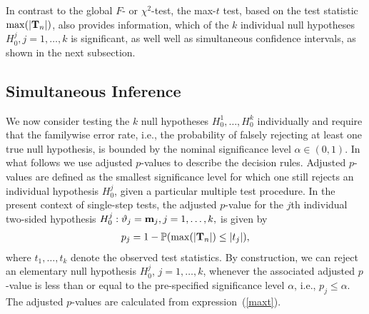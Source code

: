 \documentclass[12pt,a4paper]{article}
\begin{document}
In contrast to the global $F$- or $\chi^2$-test, the max-$t$ test,
based on the test statistic $\max(|\mathbf{T}_n|)$, also provides information, 
which of the $k$ individual null hypotheses $%
H_0^j, j = 1, \dots, k$ is significant,
as well well as simultaneous confidence intervals, as shown in the next
subsection.

\subsection{Simultaneous Inference}

\label{simtest} %

We now consider testing the $k$ null hypotheses $H_0^1, \ldots, H_0^k$
individually and require that the familywise error rate, i.e., the
probability of falsely rejecting at least one true null hypothesis, is
bounded by the nominal significance level $\alpha \in (0, 1)$. In what
follows we use adjusted $p$-values to describe the decision rules. Adjusted $%
p$-values are defined as the smallest significance level for which one still
rejects an individual hypothesis $H_0^j$, given a particular multiple test
procedure. In the present context of single-step tests, the adjusted $p$-value for the $j$th
individual two-sided hypothesis $H_0^j: \vartheta_j = \mathbf{m}_j, j = 1,
\dots, k, $ is given by 
\begin{eqnarray*}
p_j = 1 - \mathbb{P}(\max(|\mathbf{T}_n|) \le |t_j|),
\end{eqnarray*}
where $t_1, \dots, t_k$ denote the observed test statistics. By
construction, we can reject an elementary null hypothesis $H_0^j$, $j= 1,
\ldots, k$, whenever the associated adjusted $p$-value is less than or equal
to the pre-specified significance level $\alpha$, i.e., $p_j \leq \alpha$.
The adjusted $p$-values are calculated from expression~(\ref{maxt}).
\end{document}

